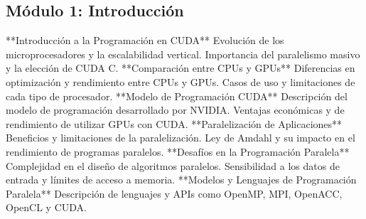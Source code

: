 \subsection{Módulo 1: Introducción}

**Introducción a la Programación en CUDA** Evolución de los microprocesadores y la escalabilidad vertical. Importancia
del paralelismo masivo y la elección de CUDA C. **Comparación entre CPUs y GPUs** Diferencias en optimización y
rendimiento entre CPUs y GPUs. Casos de uso y limitaciones de cada tipo de procesador. **Modelo de Programación CUDA**
Descripción del modelo de programación desarrollado por NVIDIA. Ventajas económicas y de rendimiento de utilizar GPUs
con CUDA. **Paralelización de Aplicaciones** Beneficios y limitaciones de la paralelización. Ley de Amdahl y su impacto
en el rendimiento de programas paralelos. **Desafíos en la Programación Paralela** Complejidad en el diseño de
algoritmos paralelos. Sensibilidad a los datos de entrada y límites de acceso a memoria. **Modelos y Lenguajes de
Programación Paralela** Descripción de lenguajes y APIs como OpenMP, MPI, OpenACC, OpenCL y CUDA.


